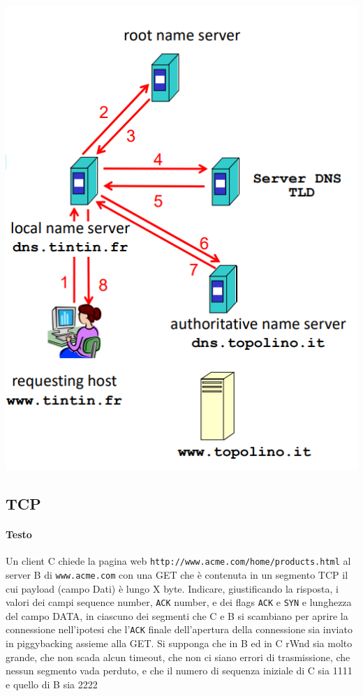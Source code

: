 \documentclass[10pt]{article}
\begin{document}
{\begin{multicols}{2}
\begin{enumerate}
\begin{center}
\includegraphics[scale=0.3]{dnsqueryiterativa.png}
\end{center}
\end{enumerate}
\end{multicols}
\pagebreak
\subsection{TCP}
\paragraph{Testo} Un client C chiede la pagina web \texttt{http://www.acme.com/home/products.html} al server B di \texttt{www.acme.com} con una GET che è contenuta in un segmento TCP il cui payload (campo Dati) è lungo X byte. Indicare, giustificando la risposta, i valori dei campi sequence number, \texttt{ACK} number, e dei flags \texttt{ACK} e \texttt{SYN} e lunghezza del campo DATA, in ciascuno dei segmenti che C e B si scambiano per aprire la connessione nell’ipotesi che l’\texttt{ACK} finale dell’apertura della connessione sia inviato in piggybacking assieme alla GET. Si supponga che in B ed in C rWnd sia molto grande, che non scada alcun timeout, che non ci siano errori di trasmissione, che nessun segmento vada perduto, e che il numero di sequenza iniziale di C sia 1111 e quello di B sia 2222
}
\end{document}
